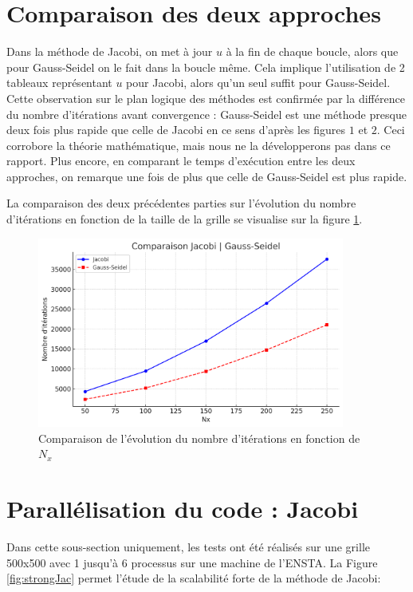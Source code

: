 \documentclass{article}
\begin{document}
\section{Comparaison des deux approches}
Dans la méthode de Jacobi, on met à jour $u$ à la fin de chaque boucle, alors que pour Gauss-Seidel on le fait dans la boucle même. Cela implique l'utilisation de 2 tableaux représentant $u$ pour Jacobi, alors qu'un seul suffit pour Gauss-Seidel. Cette observation sur le plan logique des méthodes est confirmée par la différence du nombre d'itérations avant convergence : Gauss-Seidel est une méthode presque deux fois plus rapide que celle de Jacobi en ce sens d'après les figures $1$ et $2$. Ceci corrobore la théorie mathématique, mais nous ne la développerons pas dans ce rapport. Plus encore, en comparant le temps d'exécution entre les deux approches, on remarque une fois de plus que celle de Gauss-Seidel est plus rapide.

La comparaison des deux précédentes parties sur l'évolution du nombre d'itérations en fonction de la taille de la grille se visualise sur la figure \ref{fig:comparaison}.

\begin{figure}[H]
    \centering
    \includegraphics[width=0.9\textwidth]{comparaison_j_gs.png}
    \caption{Comparaison de l'évolution du nombre d'itérations en fonction de $N_x$}
    \label{fig:comparaison}
\end{figure}


\section{Parallélisation du code : Jacobi}


Dans cette sous-section uniquement, les tests ont été réalisés sur une grille 500x500 avec 1 jusqu'à 6 processus sur une machine de l'ENSTA. La Figure \ref{fig:strongJac} permet l'étude de la scalabilité forte de la méthode de Jacobi:
\end{document}
